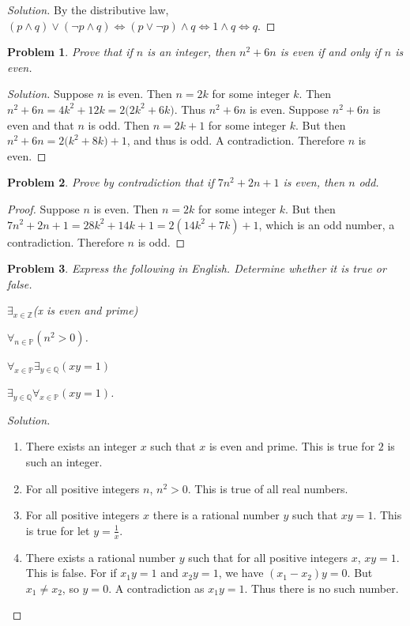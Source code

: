 \documentclass[oneside]{book}
\theoremstyle{mystyle}
\newtheorem{problem}{Problem}[section]
\begin{document}
\begin{proof}[Solution]
By the distributive law, $(p\land q)\lor(\neg p\land q) \Leftrightarrow (p\lor \neg p)\land q \Leftrightarrow 1\land q \Leftrightarrow q$.
\end{proof}
\begin{problem}
Prove that if $n$ is an integer, then $n^2+6n$ is even if and only if $n$ is even.
\end{problem}
\begin{proof}[Solution]
Suppose $n$ is even. Then $n=2k$ for some integer $k$. Then $n^2+6n = 4k^2+12k = 2\big(2k^2+6k)$. Thus $n^2+6n$ is even. Suppose $n^2+6n$ is even and that $n$ is odd. Then $n=2k+1$ for some integer $k$. But then $n^2+6n = 2\big(k^2+8k)+1$, and thus is odd. A contradiction. Therefore $n$ is even.
\end{proof}
\begin{problem}
Prove by contradiction that if $7n^2+2n + 1$ is even, then $n$ odd.
\end{problem}
\begin{proof}
Suppose $n$ is even. Then $n=2k$ for some integer $k$. But then $7n^2+2n+1 = 28k^2+14k+1 = 2(14k^2+7k)+1$, which is an odd number, a contradiction. Therefore $n$ is odd.
\end{proof}
\begin{problem}
Express the following in English. Determine whether it is true or false.
\begin{enumerate}
\begin{multicols}{4}
    \item $\exists_{x\in \mathbb{Z}}$\footnotesize{(x is even and prime)}
    \item $\forall_{n\in \mathbb{P}}(n^2>0)$.
    \item $\forall_{x\in \mathbb{P}}\exists_{y\in \mathbb{Q}}(xy=1)$
    \item $\exists_{y\in \mathbb{Q}}\forall_{x\in \mathbb{P}}(xy=1)$.
\end{multicols}
\end{enumerate}
\end{problem}
\begin{proof}[Solution]
\
\begin{enumerate}
    \item There exists an integer $x$ such that $x$ is even and prime. This is true for $2$ is such an integer.
    \item For all positive integers $n$, $n^2>0$. This is true of all real numbers.
    \item For all positive integers $x$ there is a rational number $y$ such that $xy=1$. This is true for let $y=\frac{1}{x}$.
    \item There exists a rational number $y$ such that for all positive integers $x$, $xy=1$. This is false. For if $x_1 y = 1$ and $x_2 y = 1$, we have $(x_1-x_2)y = 0$. But $x_1 \ne x_2$, so $y=0$. A contradiction as $x_1y=1$. Thus there is no such number.
\end{enumerate}
\end{proof}
\end{document}
